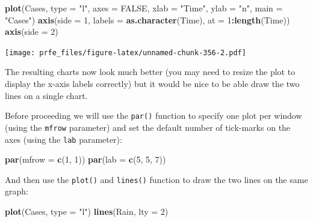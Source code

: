 \documentclass[12pt,a4paper]{book}
\newenvironment{Shaded}{\begin{snugshade}}{\end{snugshade}}
\newcommand{\DataTypeTok}[1]{\textcolor[rgb]{0.13,0.29,0.53}{#1}}
\newcommand{\DecValTok}[1]{\textcolor[rgb]{0.00,0.00,0.81}{#1}}
\newcommand{\KeywordTok}[1]{\textcolor[rgb]{0.13,0.29,0.53}{\textbf{#1}}}
\newcommand{\NormalTok}[1]{#1}
\newcommand{\OperatorTok}[1]{\textcolor[rgb]{0.81,0.36,0.00}{\textbf{#1}}}
\newcommand{\OtherTok}[1]{\textcolor[rgb]{0.56,0.35,0.01}{#1}}
\newcommand{\StringTok}[1]{\textcolor[rgb]{0.31,0.60,0.02}{#1}}
\theoremstyle{definition}
\theoremstyle{definition}
\theoremstyle{definition}
\theoremstyle{remark}
\begin{document}
\begin{Shaded}
\begin{Highlighting}[]
\KeywordTok{plot}\NormalTok{(Cases, }\DataTypeTok{type =} \StringTok{"l"}\NormalTok{, }\DataTypeTok{axes =} \OtherTok{FALSE}\NormalTok{, }\DataTypeTok{xlab =} \StringTok{"Time"}\NormalTok{, }\DataTypeTok{ylab =} \StringTok{"n"}\NormalTok{, }\DataTypeTok{main =} \StringTok{"Cases"}\NormalTok{)}
\KeywordTok{axis}\NormalTok{(}\DataTypeTok{side =} \DecValTok{1}\NormalTok{, }\DataTypeTok{labels =} \KeywordTok{as.character}\NormalTok{(Time), }\DataTypeTok{at =} \DecValTok{1}\OperatorTok{:}\KeywordTok{length}\NormalTok{(Time))}
\KeywordTok{axis}\NormalTok{(}\DataTypeTok{side =} \DecValTok{2}\NormalTok{)}
\end{Highlighting}
\end{Shaded}

\texttt{[image: prfe\_files/figure-latex/unnamed-chunk-356-2.pdf]}

The resulting charts now look much better (you may need to resize the
plot to display the x-axis labels correctly) but it would be nice to be
able draw the two lines on a single chart.

Before proceeding we will use the \texttt{par()} function to specify one
plot per window (using the \texttt{mfrow} parameter) and set the default
number of tick-marks on the axes (using the \texttt{lab} parameter):

\begin{Shaded}
\begin{Highlighting}[]
\KeywordTok{par}\NormalTok{(}\DataTypeTok{mfrow =} \KeywordTok{c}\NormalTok{(}\DecValTok{1}\NormalTok{, }\DecValTok{1}\NormalTok{))}
\KeywordTok{par}\NormalTok{(}\DataTypeTok{lab =} \KeywordTok{c}\NormalTok{(}\DecValTok{5}\NormalTok{, }\DecValTok{5}\NormalTok{, }\DecValTok{7}\NormalTok{))}
\end{Highlighting}
\end{Shaded}

And then use the \texttt{plot()} and \texttt{lines()} function to draw
the two lines on the same graph:

\begin{Shaded}
\begin{Highlighting}[]
\KeywordTok{plot}\NormalTok{(Cases, }\DataTypeTok{type =} \StringTok{"l"}\NormalTok{)}
\KeywordTok{lines}\NormalTok{(Rain, }\DataTypeTok{lty =} \DecValTok{2}\NormalTok{)}
\end{Highlighting}
\end{Shaded}
\end{document}
